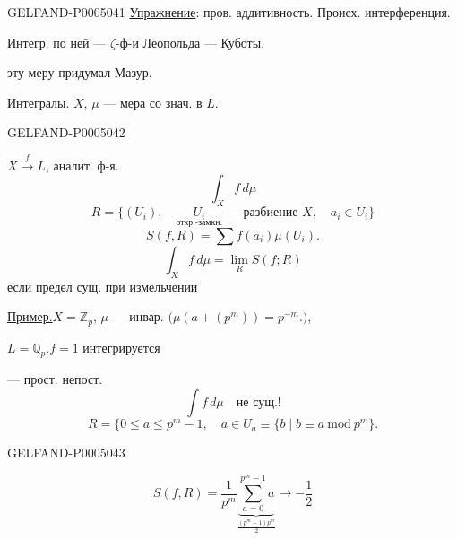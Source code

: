 \begin{GelfandAdjacentEvidence}{GELFAND-P000504}{1}
\uline{Упражнение}: пров. аддитивность. Происх. интерференция.

Интегр. по ней — $\zeta$-ф-и Леопольда — Куботы.

эту меру придумал Мазур.

\uline{Интегралы.}\qquad
$X$, $\mu$ — мера со знач. в $L$.
\end{GelfandAdjacentEvidence}
\begin{GelfandAdjacentEvidence}{GELFAND-P000504}{2}


$X\overset f\longrightarrow L$, аналит. ф-я.
\[
\int_X f\,d\mu
\]
\[
R=\{(U_i),\quad\underset{\text{откр.-замкн.}}{U_i}
\text{ — разбиение }X,\quad a_i\in U_i\}
\]
\[
S(f,R)=\sum f(a_i)\mu(U_i).
\]
\[
\int_X f\,d\mu=\lim_R S(f;R)
\]
если предел сущ. при измельчении

\uline{Пример.}\qquad $X=\mathbb Z_p$, $\mu$ — инвар.
\(\bigl(\mu(a+(p^m))=p^{-m}.\bigr)\),

$L=\mathbb Q_p$.\qquad $f=1$ интегрируется

 — прост. непост.
\[
\int f\,d\mu\quad\text{не сущ.!}
\]
\[
R=\{0\le a\le p^m-1,\quad a\in U_a\equiv\{b\mid b\equiv a\ \mathrm{mod}\ p^m\}.
\]
\end{GelfandAdjacentEvidence}
\begin{GelfandAdjacentEvidence}{GELFAND-P000504}{3}

\[
S(f,R)=\frac1{p^m}\underbrace{\sum_{a=0}^{p^m-1}a}_{\displaystyle\frac{(p^m-1)p^m}{2}}
\longrightarrow-\frac12
\]
\end{GelfandAdjacentEvidence}
